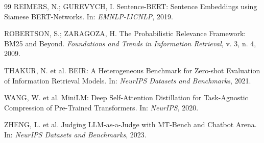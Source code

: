 \documentclass[11pt,a4paper]{article}
\begin{document}
\begin{thebibliography}{99}
 REIMERS, N.; GUREVYCH, I. Sentence-BERT: Sentence Embeddings using Siamese BERT-Networks. In: \emph{EMNLP-IJCNLP}, 2019.

 ROBERTSON, S.; ZARAGOZA, H. The Probabilistic Relevance Framework: BM25 and Beyond. \emph{Foundations and Trends in Information Retrieval}, v. 3, n. 4, 2009.

 THAKUR, N. et al. BEIR: A Heterogeneous Benchmark for Zero-shot Evaluation of Information Retrieval Models. In: \emph{NeurIPS Datasets and Benchmarks}, 2021.

 WANG, W. et al. MiniLM: Deep Self-Attention Distillation for Task-Agnostic Compression of Pre-Trained Transformers. In: \emph{NeurIPS}, 2020.

 ZHENG, L. et al. Judging LLM-as-a-Judge with MT-Bench and Chatbot Arena. In: \emph{NeurIPS Datasets and Benchmarks}, 2023.

\end{thebibliography}
\end{document}
